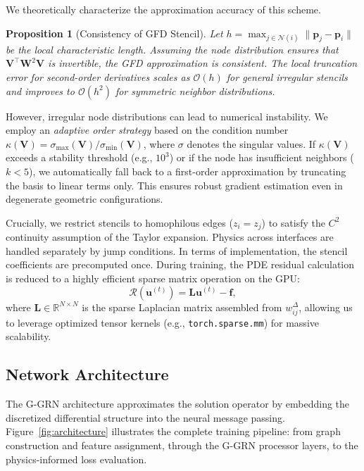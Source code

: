 \documentclass[11pt]{article}
\theoremstyle{definition}
\theoremstyle{remark}
\theoremstyle{plain}
\newtheorem{proposition}{Proposition} %
\begin{document}
We theoretically characterize the approximation accuracy of this scheme.
\begin{proposition}[Consistency of GFD Stencil]
\label{prop:consistency}
Let $h = \max_{j \in \mathcal{N}(i)} \|\mathbf{p}_j - \mathbf{p}_i\|$ be the local characteristic length. Assuming the node distribution ensures that $\mathbf{V}^\top \mathbf{W}^2 \mathbf{V}$ is invertible, the GFD approximation is consistent. The local truncation error for second-order derivatives scales as $\mathcal{O}(h)$ for general irregular stencils and improves to $\mathcal{O}(h^2)$ for symmetric neighbor distributions.
\end{proposition}

However, irregular node distributions can lead to numerical instability. We employ an \textit{adaptive order strategy} based on the condition number $\kappa(\mathbf{V}) = \sigma_{\max}(\mathbf{V}) / \sigma_{\min}(\mathbf{V})$, where $\sigma$ denotes the singular values. If $\kappa(\mathbf{V})$ exceeds a stability threshold (e.g., $10^3$) or if the node has insufficient neighbors ($k < 5$), we automatically fall back to a first-order approximation by truncating the basis to linear terms only. This ensures robust gradient estimation even in degenerate geometric configurations.

Crucially, we restrict stencils to homophilous edges ($z_i = z_j$) to satisfy the $C^2$ continuity assumption of the Taylor expansion. Physics across interfaces are handled separately by jump conditions. In terms of implementation, the stencil coefficients are precomputed once. During training, the PDE residual calculation is reduced to a highly efficient sparse matrix operation on the GPU:
\begin{equation}
    \mathcal{R}(\mathbf{u}^{(t)}) = \mathbf{L} \mathbf{u}^{(t)} - \mathbf{f},
\end{equation}
where $\mathbf{L} \in \mathbb{R}^{N \times N}$ is the sparse Laplacian matrix assembled from $w_{ij}^{\Delta}$, allowing us to leverage optimized tensor kernels (e.g., \texttt{torch.sparse.mm}) for massive scalability.

\subsection{Network Architecture}
\label{sec:architecture}

The G-GRN architecture approximates the solution operator by embedding the discretized differential structure into the neural message passing. Figure~\ref{fig:architecture} illustrates the complete training pipeline: from graph construction and feature assignment, through the G-GRN processor layers, to the physics-informed loss evaluation.
\end{document}
